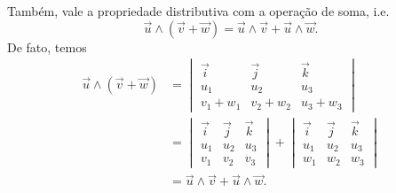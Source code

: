 Também, vale a propriedade distributiva com a operação de soma, i.e.
\begin{equation}
  \vec{u}\land(\vec{v} + \vec{w}) = \vec{u}\land\vec{v}+\vec{u}\land\vec{w}.
\end{equation}
De fato, temos
\begin{align}
  \vec{u}\land(\vec{v}+\vec{w}) &=
                                  \begin{vmatrix}
                                    \vec{i} & \vec{j} & \vec{k} \\
                                    u_1 & u_2 & u_3 \\
                                    v_1+w_1 & v_2+w_2 & u_3+w_3
                                  \end{vmatrix} \\
                                &=
                                  \begin{vmatrix}
                                    \vec{i} & \vec{j} & \vec{k} \\
                                    u_1 & u_2 & u_3 \\
                                    v_1 & v_2 & v_3                                    
                                  \end{vmatrix}
                                                +
                                                \begin{vmatrix}
                                                  \vec{i} & \vec{j} & \vec{k} \\
                                                  u_1 & u_2 & u_3 \\
                                                  w_1 & w_2 & w_3                                    
                                                \end{vmatrix}\\
                                &= \vec{u}\land\vec{v} + \vec{u}\land\vec{w}.
\end{align}

